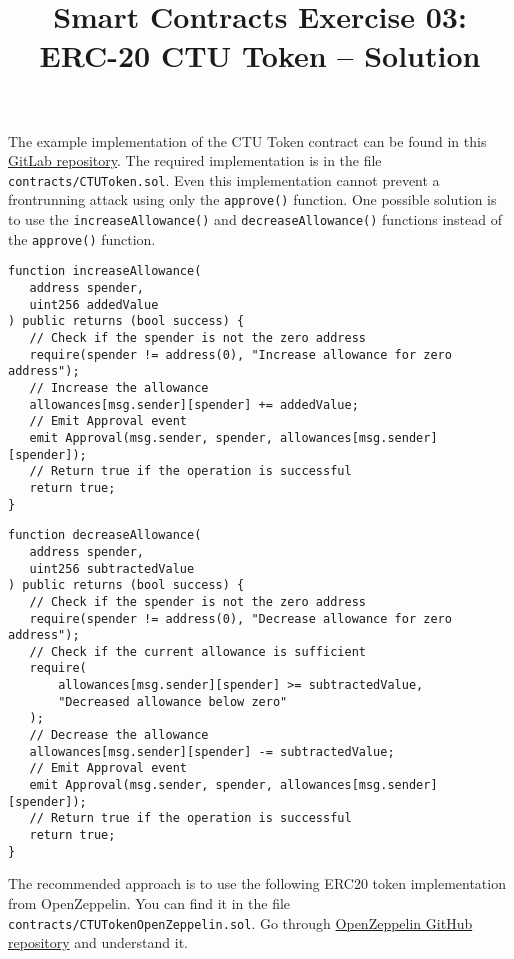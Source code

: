 \documentclass[12pt]{article}
\title{Smart Contracts Exercise 03: \\ ERC-20 CTU Token -- Solution}
\author{}
\date{}
\begin{document}
\maketitle
The example implementation of the CTU Token contract can be found in this \href{https://gitlab.fel.cvut.cz/radovluk/smart-contracts-exercises/-/tree/main/03-ERC20-CTUToken/solution/solution-code}{GitLab repository}. The required implementation is in the file \texttt{contracts/CTUToken.sol}. Even this implementation cannot prevent a frontrunning attack using only the \texttt{approve()} function. One possible solution is to use the \texttt{increaseAllowance()} and \texttt{decreaseAllowance()} functions instead of the \texttt{approve()} function.

\begin{lstlisting}[language=Solidity]
function increaseAllowance(
   address spender,
   uint256 addedValue
) public returns (bool success) {
   // Check if the spender is not the zero address
   require(spender != address(0), "Increase allowance for zero address");
   // Increase the allowance
   allowances[msg.sender][spender] += addedValue;
   // Emit Approval event
   emit Approval(msg.sender, spender, allowances[msg.sender][spender]);
   // Return true if the operation is successful
   return true;
}
\end{lstlisting}

\begin{lstlisting}[language=Solidity]
function decreaseAllowance(
   address spender,
   uint256 subtractedValue
) public returns (bool success) {
   // Check if the spender is not the zero address
   require(spender != address(0), "Decrease allowance for zero address");
   // Check if the current allowance is sufficient
   require(
       allowances[msg.sender][spender] >= subtractedValue,
       "Decreased allowance below zero"
   );
   // Decrease the allowance
   allowances[msg.sender][spender] -= subtractedValue;
   // Emit Approval event
   emit Approval(msg.sender, spender, allowances[msg.sender][spender]);
   // Return true if the operation is successful
   return true;
}
\end{lstlisting}

The recommended approach is to use the following ERC20 token implementation from OpenZeppelin. You can find it in the file \texttt{contracts/CTUTokenOpenZeppelin.sol}.
Go through \href{https://github.com/OpenZeppelin/openzeppelin-contracts/blob/master/contracts/token/ERC20/ERC20.sol}{OpenZeppelin GitHub repository} and understand it.
\end{document}
